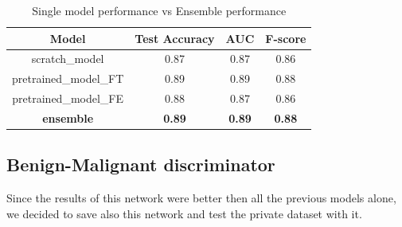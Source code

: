 \documentclass[11pt,a4paper,oneside]{article}
\begin{document}
\begin{table}[h]
\centering
	\begin{tabular}{|c|ccc|}
	\hline
	Model & Test Accuracy & AUC & F-score \\
	\hline
	scratch\_model 		  & 0.87 & 0.87 & 0.86 \\
	pretrained\_model\_FT & 0.89 & 0.89 & 0.88 \\
	pretrained\_model\_FE & 0.88 & 0.87 & 0.86 \\
	\textbf{ensemble}     & \textbf{0.89} & \textbf{0.89} & \textbf{0.88} \\
	\hline
	\end{tabular}
\caption{Single model performance vs Ensemble performance}
\end{table}

\clearpage

\subsection{Benign-Malignant discriminator}
Since the results of this network were better then all the previous models alone, we decided to save also this network and test the private dataset with it.
\end{document}
